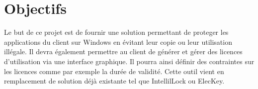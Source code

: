 \chapter{Objectifs}

Le but de ce projet est de fournir une solution permettant de proteger les 
applications du client sur Windows en évitant leur copie ou leur utilisation illégale. 
Il devra également permettre au client de générer et gérer des licences d'utilisation 
via une interface graphique. Il pourra ainsi définir des contraintes sur les licences 
comme par exemple la durée de validité. \newline
Cette outil vient en remplacement de solution déjà existante tel que 
	IntellilLock ou ElecKey.
